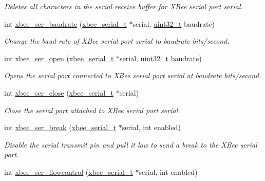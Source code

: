 \begin{DoxyCompactItemize}
\begin{DoxyCompactList}\small\item\em Deletes all characters in the serial receive buffer for X\+Bee serial port {\itshape serial}. \end{DoxyCompactList}\item 
int \hyperlink{group__hal__posix_gab3c12543a07e0669b672c5cab54b0926}{xbee\+\_\+ser\+\_\+baudrate} (\hyperlink{structxbee__serial__t}{xbee\+\_\+serial\+\_\+t} $\ast$serial, \hyperlink{group__hal__dos_ga09a1e304d66d35dd47daffee9731edaa}{uint32\+\_\+t} baudrate)
\begin{DoxyCompactList}\small\item\em Change the baud rate of X\+Bee serial port {\itshape serial} to {\itshape baudrate} bits/second. \end{DoxyCompactList}\item 
int \hyperlink{group__hal__posix_gaa615a221dd69c17ee2989c281f2bf04a}{xbee\+\_\+ser\+\_\+open} (\hyperlink{structxbee__serial__t}{xbee\+\_\+serial\+\_\+t} $\ast$serial, \hyperlink{group__hal__dos_ga09a1e304d66d35dd47daffee9731edaa}{uint32\+\_\+t} baudrate)
\begin{DoxyCompactList}\small\item\em Opens the serial port connected to X\+Bee serial port {\itshape serial} at {\itshape baudrate} bits/second. \end{DoxyCompactList}\item 
int \hyperlink{group__hal__posix_ga48b9d743a446074ea6abacd0de24044d}{xbee\+\_\+ser\+\_\+close} (\hyperlink{structxbee__serial__t}{xbee\+\_\+serial\+\_\+t} $\ast$serial)
\begin{DoxyCompactList}\small\item\em Close the serial port attached to X\+Bee serial port {\itshape serial}. \end{DoxyCompactList}\item 
int \hyperlink{group__hal__posix_ga6ae89792415a7ac8b45b56188eb9eeb4}{xbee\+\_\+ser\+\_\+break} (\hyperlink{structxbee__serial__t}{xbee\+\_\+serial\+\_\+t} $\ast$serial, int enabled)
\begin{DoxyCompactList}\small\item\em Disable the serial transmit pin and pull it low to send a break to the X\+Bee serial port. \end{DoxyCompactList}\item 
int \hyperlink{group__hal__posix_ga1f5f72ffdfbfb45ac523640db32296ff}{xbee\+\_\+ser\+\_\+flowcontrol} (\hyperlink{structxbee__serial__t}{xbee\+\_\+serial\+\_\+t} $\ast$serial, int enabled)

\end{DoxyCompactItemize}
